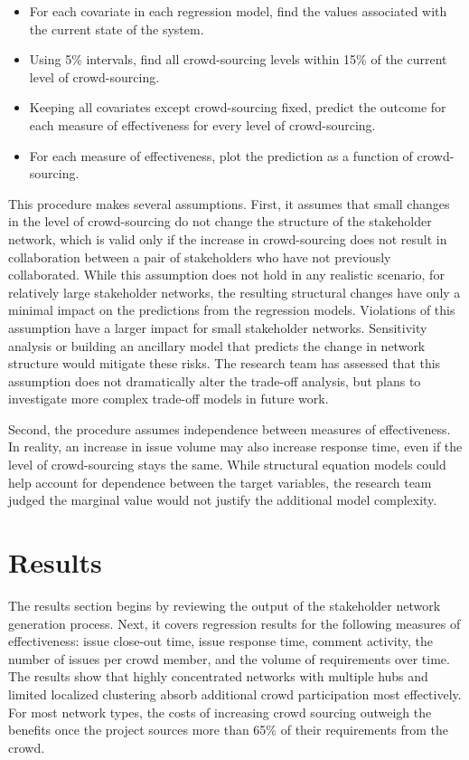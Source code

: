 \begin{itemize}
    \item For each covariate in each regression model, find the values associated with the current state of the system.
    \item Using 5\% intervals, find all crowd-sourcing levels within 15\% of the current level of crowd-sourcing.
    \item Keeping all covariates except crowd-sourcing fixed, predict the outcome for each measure of effectiveness for every level of crowd-sourcing.
    \item For each measure of effectiveness, plot the prediction as a function of crowd-sourcing.
\end{itemize}

This procedure makes several assumptions. First, it assumes that small changes in the level of crowd-sourcing do not change the structure of the stakeholder network, which is valid only if the increase in crowd-sourcing does not result in collaboration between a pair of stakeholders who have not previously collaborated. While this assumption does not hold in any realistic scenario, for relatively large stakeholder networks, the resulting structural changes have only a minimal impact on the predictions from the regression models. Violations of this assumption have a larger impact for small stakeholder networks. Sensitivity analysis or building an ancillary model that predicts the change in network structure would mitigate these risks. The research team has assessed that this assumption does not dramatically alter the trade-off analysis, but plans to investigate more complex trade-off models in future work.

Second, the procedure assumes independence between measures of effectiveness. In reality, an increase in issue volume may also increase response time, even if the level of crowd-sourcing stays the same. While structural equation models \cite{ullman} could help account for dependence between the target variables, the research team judged the marginal value would not justify the additional model complexity. 

\section{Results}
\label{results_section}

The results section begins by reviewing the output of the stakeholder network generation process. Next, it covers regression results for the following measures of effectiveness: issue close-out time, issue response time, comment activity, the number of issues per crowd member, and the volume of requirements over time. The results show that highly concentrated networks with multiple hubs and limited localized clustering absorb additional crowd participation most effectively. For most network types, the costs of increasing crowd sourcing outweigh the benefits once the project sources more than 65\% of their requirements from the crowd.

